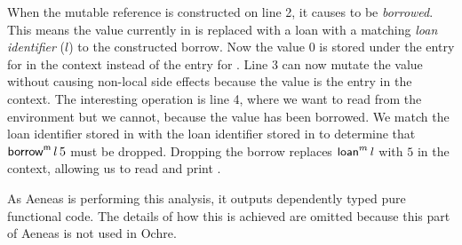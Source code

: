 \documentclass[12pt,twoside]{report}
\begin{document}
When the mutable reference is constructed on line 2, it causes  to be \textit{borrowed}. This means the value currently in  is replaced with a loan with a matching \textit{loan identifier} ($l$) to the constructed borrow. Now the value $0$ is stored under the entry for  in the context instead of the entry for . Line 3 can now mutate the value without causing non-local side effects because the value is the  entry in the context. The interesting operation is line 4, where we want to read  from the environment but we cannot, because the value has been borrowed. We match the loan identifier stored in  with the loan identifier stored in  to determine that $\mathsf{borrow}^{\mathsf{m}}\,l\,5$ must be dropped. Dropping the borrow replaces $\mathsf{loan}^m\,l$ with $5$ in the context, allowing us to read and print .

As Aeneas is performing this analysis, it outputs dependently typed pure functional code. The details of how this is achieved are omitted because this part of Aeneas is not used in Ochre. 




\end{document}

